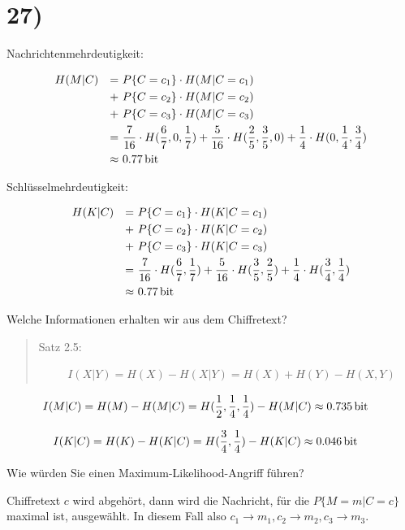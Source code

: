   \section*{27)}

  Nachrichtenmehrdeutigkeit:

  \begin{align*}
    & H(M | C) & = &\ P\{C = c_1\} \cdot H(M | C = c_1)\\
    &          & + &\ P\{C = c_2\} \cdot H(M | C = c_2)\\
    &          & + &\ P\{C = c_3\} \cdot H(M | C = c_3)\\
    &          & = &\ \frac{7}{16} \cdot H(\frac{6}{7}, 0,  \frac{1}{7}) + \frac{5}{16} \cdot H(\frac{2}{5}, \frac{3}{5}, 0) + \frac{1}{4} \cdot H(0, \frac{1}{4}, \frac{3}{4})\\
    &          & \approx &\ \SI{0,77}{\bit}
  \end{align*}

  Schlüsselmehrdeutigkeit:

  \begin{align*}
    & H(K | C) & = &\ P\{C = c_1\} \cdot H(K | C = c_1)\\
    &          & + &\ P\{C = c_2\} \cdot H(K | C = c_2)\\
    &          & + &\ P\{C = c_3\} \cdot H(K | C = c_3)\\
    &          & = &\ \frac{7}{16} \cdot H(\frac{6}{7}, \frac{1}{7}) + \frac{5}{16} \cdot H(\frac{3}{5}, \frac{2}{5}) + \frac{1}{4} \cdot H(\frac{3}{4}, \frac{1}{4})\\
    &          & \approx &\ \SI{0,77}{\bit}
  \end{align*}

  Welche Informationen erhalten wir aus dem Chiffretext?

  \begin{quote}
    Satz 2.5:

    \begin{align*}
      & I(X | Y) = H(X) - H(X | Y) = H(X) + H(Y) - H(X, Y)
    \end{align*}
  \end{quote}

  \begin{align*}
    & I(M | C) = H(M) - H(M | C) = H(\frac{1}{2}, \frac{1}{4}, \frac{1}{4}) - H(M | C) \approx \SI{0,735}{\bit}
  \end{align*}

  \begin{align*}
    & I(K | C) = H(K) - H(K | C) = H(\frac{3}{4}, \frac{1}{4}) - H(K | C) \approx \SI{0,046}{\bit}
  \end{align*}

  Wie würden Sie einen Maximum-Likelihood-Angriff führen?

  Chiffretext $c$ wird abgehört, dann wird die Nachricht, für die $P\{M = m | C = c\}$ maximal ist, ausgewählt. In diesem Fall also $c_1 \rightarrow m_1, c_2 \rightarrow m_2, c_3 \rightarrow m_3$.

